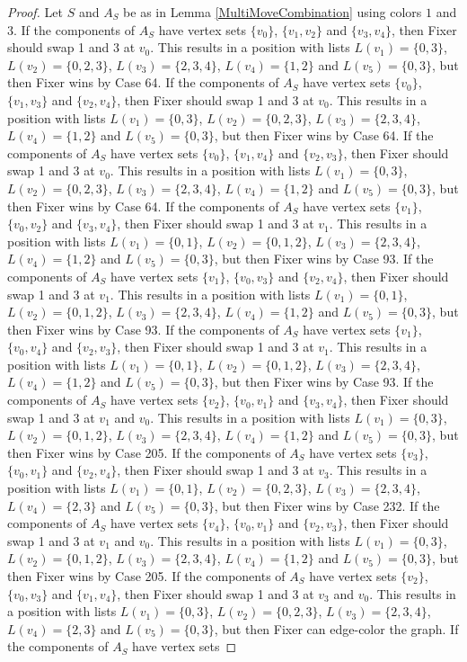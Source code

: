\documentclass[12pt]{amsart}
\theoremstyle{plain}
\theoremstyle{definition}
\theoremstyle{remark}
\begin{document}
\begin{proof}
Let $S$ and $A_S$ be as in Lemma \ref{MultiMoveCombination} using colors $1$ and $3$. If the components of $A_S$ have vertex sets $\{v_0\}$, $\{v_1, v_2\}$ and $\{v_3, v_4\}$, then Fixer should swap 1 and 3 at $v_0$. This results in a position with lists $L(v_1) = \{0, 3\}$, $L(v_2) = \{0, 2, 3\}$, $L(v_3) = \{2, 3, 4\}$, $L(v_4) = \{1, 2\}$ and $L(v_5) = \{0, 3\}$, but then Fixer wins by Case 64. If the components of $A_S$ have vertex sets $\{v_0\}$, $\{v_1, v_3\}$ and $\{v_2, v_4\}$, then Fixer should swap 1 and 3 at $v_0$. This results in a position with lists $L(v_1) = \{0, 3\}$, $L(v_2) = \{0, 2, 3\}$, $L(v_3) = \{2, 3, 4\}$, $L(v_4) = \{1, 2\}$ and $L(v_5) = \{0, 3\}$, but then Fixer wins by Case 64. If the components of $A_S$ have vertex sets $\{v_0\}$, $\{v_1, v_4\}$ and $\{v_2, v_3\}$, then Fixer should swap 1 and 3 at $v_0$. This results in a position with lists $L(v_1) = \{0, 3\}$, $L(v_2) = \{0, 2, 3\}$, $L(v_3) = \{2, 3, 4\}$, $L(v_4) = \{1, 2\}$ and $L(v_5) = \{0, 3\}$, but then Fixer wins by Case 64. If the components of $A_S$ have vertex sets $\{v_1\}$, $\{v_0, v_2\}$ and $\{v_3, v_4\}$, then Fixer should swap 1 and 3 at $v_1$. This results in a position with lists $L(v_1) = \{0, 1\}$, $L(v_2) = \{0, 1, 2\}$, $L(v_3) = \{2, 3, 4\}$, $L(v_4) = \{1, 2\}$ and $L(v_5) = \{0, 3\}$, but then Fixer wins by Case 93. If the components of $A_S$ have vertex sets $\{v_1\}$, $\{v_0, v_3\}$ and $\{v_2, v_4\}$, then Fixer should swap 1 and 3 at $v_1$. This results in a position with lists $L(v_1) = \{0, 1\}$, $L(v_2) = \{0, 1, 2\}$, $L(v_3) = \{2, 3, 4\}$, $L(v_4) = \{1, 2\}$ and $L(v_5) = \{0, 3\}$, but then Fixer wins by Case 93. If the components of $A_S$ have vertex sets $\{v_1\}$, $\{v_0, v_4\}$ and $\{v_2, v_3\}$, then Fixer should swap 1 and 3 at $v_1$. This results in a position with lists $L(v_1) = \{0, 1\}$, $L(v_2) = \{0, 1, 2\}$, $L(v_3) = \{2, 3, 4\}$, $L(v_4) = \{1, 2\}$ and $L(v_5) = \{0, 3\}$, but then Fixer wins by Case 93. If the components of $A_S$ have vertex sets $\{v_2\}$, $\{v_0, v_1\}$ and $\{v_3, v_4\}$, then Fixer should swap 1 and 3 at $v_1$ and $v_0$. This results in a position with lists $L(v_1) = \{0, 3\}$, $L(v_2) = \{0, 1, 2\}$, $L(v_3) = \{2, 3, 4\}$, $L(v_4) = \{1, 2\}$ and $L(v_5) = \{0, 3\}$, but then Fixer wins by Case 205. If the components of $A_S$ have vertex sets $\{v_3\}$, $\{v_0, v_1\}$ and $\{v_2, v_4\}$, then Fixer should swap 1 and 3 at $v_3$. This results in a position with lists $L(v_1) = \{0, 1\}$, $L(v_2) = \{0, 2, 3\}$, $L(v_3) = \{2, 3, 4\}$, $L(v_4) = \{2, 3\}$ and $L(v_5) = \{0, 3\}$, but then Fixer wins by Case 232. If the components of $A_S$ have vertex sets $\{v_4\}$, $\{v_0, v_1\}$ and $\{v_2, v_3\}$, then Fixer should swap 1 and 3 at $v_1$ and $v_0$. This results in a position with lists $L(v_1) = \{0, 3\}$, $L(v_2) = \{0, 1, 2\}$, $L(v_3) = \{2, 3, 4\}$, $L(v_4) = \{1, 2\}$ and $L(v_5) = \{0, 3\}$, but then Fixer wins by Case 205. If the components of $A_S$ have vertex sets $\{v_2\}$, $\{v_0, v_3\}$ and $\{v_1, v_4\}$, then Fixer should swap 1 and 3 at $v_3$ and $v_0$. This results in a position with lists $L(v_1) = \{0, 3\}$, $L(v_2) = \{0, 2, 3\}$, $L(v_3) = \{2, 3, 4\}$, $L(v_4) = \{2, 3\}$ and $L(v_5) = \{0, 3\}$, but then Fixer can edge-color the graph. If the components of $A_S$ have vertex sets 
\end{proof}
\end{document}

